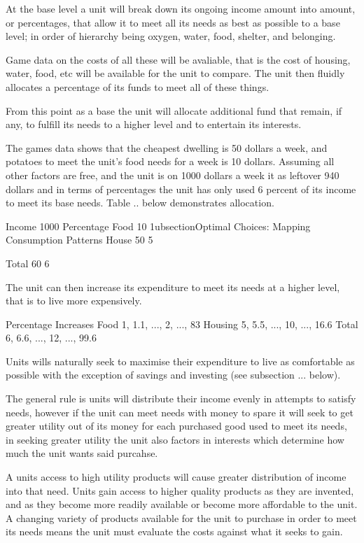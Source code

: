 
At the base level a unit will break down its ongoing income amount into amount, or percentages, that allow it to meet all its needs as best as possible to a base level; in order of hierarchy being oxygen, water, food, shelter, and belonging.

Game data on the costs of all these will be avaliable, that is the cost of housing, water, food, etc will be available for the unit to compare. The unit then fluidly allocates a percentage of its funds to meet all of these things.

From this point as a base the unit will allocate additional fund that remain, if any, to fulfill its needs to a higher level and to entertain its interests. 

The games data shows that the cheapest dwelling is 50 dollars a week, and potatoes to meet the unit's food needs for a week is 10 dollars. Assuming all other factors are free, and the unit is on 1000 dollars a week it as leftover 940 dollars and in terms of percentages the unit has only used 6 percent of its income to meet its base needs. Table .. below demonstrates allocation.

Income	1000	Percentage 
Food	  10	  	 1ubsection{Optimal Choices: Mapping Consumption Patterns}
House	  50	  	 5

Total	  60	  	 6


The unit can then increase its expenditure to meet its needs at a higher level, that is to live more expensively.

	 Percentage Increases	
Food	 1, 1.1, ...,  2,  ...,  83 
Housing	 5, 5.5, ..., 10,  ...,  16.6
Total	 6, 6.6, ..., 12,  ...,  99.6

Units wills naturally seek to maximise their expenditure to live as comfortable as possible with the exception of savings and investing (see subsection ... below).

The general rule is units will distribute their income evenly in attempts to satisfy needs, however if the unit can meet needs with money to spare it will seek to get greater utility out of its money for each purchased good used to meet its needs, in seeking greater utility the unit also factors in interests which determine how much the unit wants said purcahse.

A units access to high utility products will cause greater distribution of income into that need. Units gain access to higher quality products as they are invented, and as they become more readily available or become more affordable to the unit. A changing variety of products available for the unit to purchase in order to meet its needs means the unit must evaluate the costs against what it seeks to gain. 

